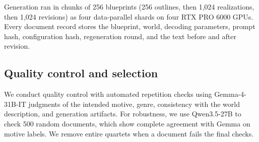 \documentclass{article} %
\begin{document}
Generation ran in chunks of 256 blueprints (256 outlines, then 1,024 realizations, then 1,024 revisions) as four data-parallel shards on four RTX PRO 6000 GPUs. Every document record stores the blueprint, world, decoding parameters, prompt hash, configuration hash, regeneration round, and the text before and after revision.

\par{}
\begingroup
{}
\label{fig:corpus-generation-prompts}

\par\endgroup


\subsection{Quality control and selection}
\label{app:corpus-qc}

We conduct quality control with automated repetition checks using Gemma-4-31B-IT judgments of the intended motive, genre, consistency with the world description, and generation artifacts. For robustness, we use Qwen3.5-27B to check 500 random documents, which show complete agreement with Gemma on motive labels. We remove entire quartets when a document fails the final checks.
\end{document}
